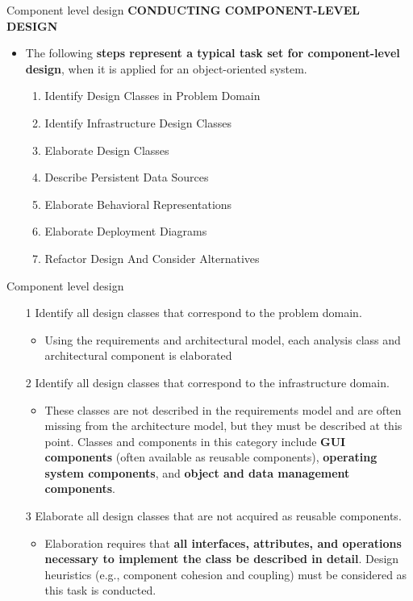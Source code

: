 \documentclass{beamer}
\begin{document}
\begin{frame}{Component level design}
	\textbf{CONDUCTING COMPONENT-LEVEL DESIGN}
	\begin{itemize}
		\item The following \textbf{steps represent a typical task set for component-level design}, when 
		it is applied for an object-oriented system.
	\begin{enumerate}
		\item Identify Design Classes in Problem Domain
		\item Identify Infrastructure Design Classes
		\item Elaborate Design Classes
		\item Describe Persistent Data Sources
		\item Elaborate Behavioral Representations
		\item Elaborate Deployment Diagrams
		\item Refactor Design And Consider Alternatives
	\end{enumerate}
	\end{itemize}
\end{frame}

\begin{frame}{Component level design}
	\begin{itemize}
		\item[1] Identify all design classes that correspond to the problem domain.
		\begin{itemize}
			\item Using
			the requirements and architectural model, each analysis class and architectural
			component is elaborated
		\end{itemize}
		\item[2] Identify all design classes that correspond to the infrastructure domain.
		\begin{itemize}
			
			\item These classes are not described in the requirements model and are often missing
			from the architecture model, but they must be described at this point. Classes and 
			components in this category include \textbf{GUI components} (often available as reusable components), \textbf{operating system components}, and \textbf{object and data management
				components}.
			
		\end{itemize}
		\item[3] Elaborate all design classes that are not acquired as reusable components.
		\begin{itemize}
			\item Elaboration requires that \textbf{all interfaces, attributes, and operations necessary to
				implement the class be described in detail}. Design heuristics (e.g., component
			cohesion and coupling) must be considered as this task is conducted.

		\end{itemize}
	\end{itemize}
\end{frame}
\end{document}
